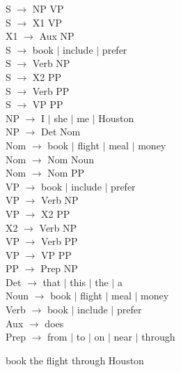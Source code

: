 \documentclass[a4paper,12pt]{article}
\begin{document}
\begin{multicols}{2}
S $\to$ NP VP \\
S $\to$ X1 VP \\
X1 $\to$ Aux NP \\
S $\to$ book $\mid$ include $\mid$ prefer \\
S $\to$ Verb NP \\
S $\to$ X2 PP \\
S $\to$ Verb PP \\
S $\to$ VP PP \\
NP $\to$ I $\mid$ she $\mid$ me $\mid$ Houston \\
NP $\to$ Det Nom \\
Nom $\to$ book $\mid$ flight $\mid$ meal $\mid$ money \\
Nom $\to$ Nom Noun \\
Nom $\to$ Nom PP \\
VP $\to$ book $\mid$ include $\mid$ prefer \\
VP $\to$ Verb NP \\
VP $\to$ X2 PP \\
X2 $\to$ Verb NP \\
VP $\to$ Verb PP \\
VP $\to$ VP PP \\
PP $\to$ Prep NP \\
Det $\to$ that $\mid$ this $\mid$ the $\mid$ a \\
Noun $\to$ book $\mid$ flight $\mid$ meal $\mid$ money \\
Verb $\to$ book $\mid$ include $\mid$ prefer \\
Aux $\to$ does \\
Prep $\to$ from $\mid$ to $\mid$ on $\mid$ near $\mid$ through \\
\end{multicols}

\vspace{5mm}

book the flight through Houston \\
\end{document}
